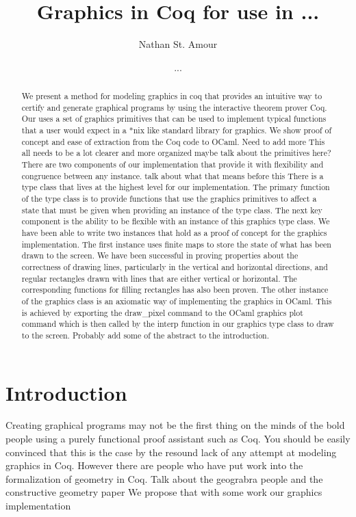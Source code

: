 \documentclass{llncs}
\begin{document}
\title{Graphics in Coq for use in ...}

\author{Nathan St. Amour \and ...}

\maketitle


\begin{abstract}
We present a method for modeling graphics in coq that provides an intuitive way to certify and generate graphical programs by using the interactive
theorem prover Coq.  Our uses a set of graphics primitives that can be used to implement typical functions that a user would expect in a *nix like
standard library for graphics.  We show proof of concept and ease of extraction from the Coq code to OCaml. {\color{red} Need to add more}
{\color{red} This all needs to be a lot clearer and more organized maybe talk about the primitives here?} There are two components of our implementation that provide it with flexibility and congruence between any instance. {\color{red}talk about what that means before this} There is a type class that lives at the highest level for our implementation.  The primary function of the type class is to provide functions that use the graphics
primitives to affect a state that must be given when providing an instance of the type class. The next key component is the ability to be flexible with an instance of this graphics type class.  We have been able to write two instances that hold as a proof of concept for the graphics implementation.  The first instance uses finite maps to store the state of what has been drawn to the screen.  We have been successful in proving properties
about the correctness of drawing lines, particularly in the vertical and horizontal directions, and regular rectangles drawn with lines that are
either vertical or horizontal.  The corresponding functions for filling rectangles has also been proven.  The other instance of the graphics class is an axiomatic way of implementing the graphics in OCaml.  This is achieved by exporting the draw\_pixel command to the OCaml graphics plot command which is then called by the interp function in our graphics type class to draw to the screen.  {\color{red}Probably add some of the abstract
to the introduction.}\end{abstract}

\section{Introduction}
Creating graphical programs may not be the first thing on the minds of the bold people using a purely functional proof assistant such as Coq.
You should be easily convinced that this is the case by the resound lack of any attempt at modeling graphics in Coq.  However there are people
who have put work into the formalization of geometry in Coq.  {\color{red} Talk about the geograbra people and the constructive geometry paper}
 We propose that with some work our graphics implementation 
\end{document}
